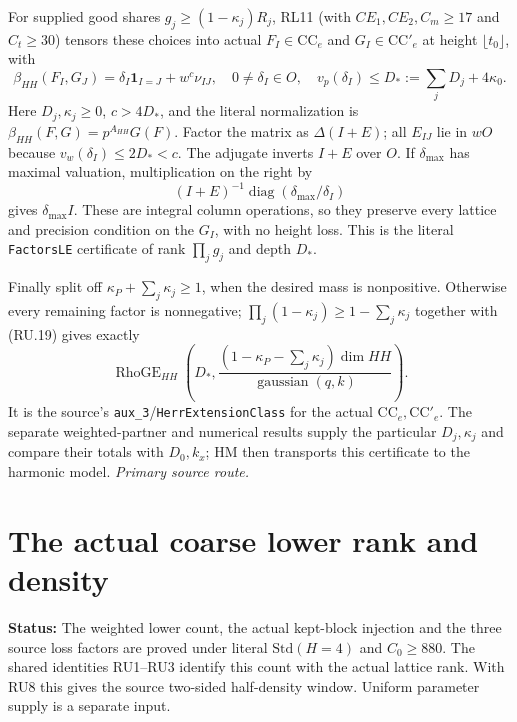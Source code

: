 \documentclass[11pt,a4paper]{article}
\numberwithin{equation}{section}
\theoremstyle{remark}\newtheorem{remark}[theorem]{Remark}
\newcommand{\status}[1]{\textbf{Status:} #1}
\begin{document}
For supplied good shares $g_j\ge(1-\kappa_j)R_j$, RL11 (with
$CE_1,CE_2,C_m\ge17$ and $C_t\ge30$) tensors
these choices into actual $F_I\in\mathrm{CC}_e$ and
$G_I\in\mathrm{CC}'_e$ at height $\lfloor t_0\rfloor$, with
\[
 \beta_{HH}(F_I,G_J)=\delta_I\mathbf1_{I=J}+w^c\nu_{IJ},
 \quad 0\ne\delta_I\in O,\quad
 v_p(\delta_I)\le D_*:=\sum_jD_j+4\kappa_0.              \tag{RU.20}
\]
Here $D_j,\kappa_j\ge0$, $c>4D_*$, and the literal normalization
is $\beta_{HH}(F,G)=p^{A_{HH}}G(F)$.
Factor the matrix as $\Delta(I+E)$; all $E_{IJ}$ lie in $wO$
because $v_w(\delta_I)\le2D_*<c$. The adjugate inverts $I+E$
over $O$. If $\delta_{\max}$ has maximal valuation, multiplication
on the right by
\[
 (I+E)^{-1}\operatorname{diag}(\delta_{\max}/\delta_I)
                                                               \tag{RU.21}
\]
gives $\delta_{\max}I$. These are integral column operations,
so they preserve every lattice and precision condition on the
$G_I$, with no height loss. This is the literal
\texttt{FactorsLE} certificate of rank $\prod_jg_j$ and depth $D_*$.

Finally split off $\kappa_P+\sum_j\kappa_j\ge1$, when the desired
mass is nonpositive. Otherwise every remaining factor is nonnegative;
$\prod_j(1-\kappa_j)\ge1-\sum_j\kappa_j$ together with (RU.19)
gives exactly
\[
 \operatorname{RhoGE}_{HH}\!\left(
 D_*,\frac{(1-\kappa_P-\sum_j\kappa_j)\dim HH}
                 {\operatorname{gaussian}(q,k)}\right).  \tag{RU.22}
\]
It is the source's \texttt{aux\_3}/\texttt{HerrExtensionClass}
for the actual $\mathrm{CC}_e,\mathrm{CC}'_e$.
The separate weighted-partner and numerical results supply the
particular $D_j,\kappa_j$ and compare their totals with $D_0,k_x$;
HM then transports this certificate to the harmonic model.
\noindent\textit{Primary source route.}\cite{coarse-rank-upper}


\section{The actual coarse lower rank and density}
\label{sec:rank-lower}

\status{The weighted lower count, the actual kept-block injection and the
three source loss factors are proved under literal $\mathrm{Std}(H=4)$
and $C_0\ge880$. The shared identities RU1--RU3 identify this count with
the actual lattice rank. With RU8 this gives the source two-sided
half-density window. Uniform parameter supply is a separate input.}
\end{document}
